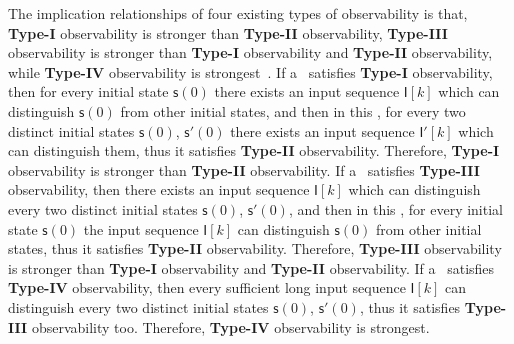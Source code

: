 The implication relationships of four existing types of observability is that, {\bf Type-I} observability is stronger than {\bf Type-II} observability, {\bf Type-III} observability is stronger than {\bf Type-I} observability and {\bf Type-II} observability, while {\bf Type-IV} observability is strongest~\cite{Zhang2016Observability}. If a \BCN\ satisfies {\bf Type-I} observability, then for every initial state $\mathsf{s}(0)$ there exists an input sequence $\mathsf{I}[k]$ which can distinguish $\mathsf{s}(0)$ from other initial states, and then in this \BCN, for every two distinct initial states $\mathsf{s}(0)$, $\mathsf{s}'(0) $ there exists an input sequence $\mathsf{I}'[k]$ which can distinguish them, thus it satisfies {\bf Type-II} observability. Therefore, {\bf Type-I} observability is stronger than {\bf Type-II} observability. If a \BCN\ satisfies {\bf Type-III} observability, then there exists an input sequence $\mathsf{I}[k]$ which can distinguish every two distinct initial states $\mathsf{s}(0)$, $\mathsf{s}'(0)$, and then in this \BCN, for every initial state $\mathsf{s}(0)$ the input sequence $\mathsf{I}[k]$ can distinguish $\mathsf{s}(0)$ from other initial states, thus it satisfies {\bf Type-II} observability. Therefore, {\bf Type-III} observability is stronger than {\bf Type-I} observability and {\bf Type-II} observability. If a \BCN\ satisfies {\bf Type-IV} observability, then every sufficient long input sequence $\mathsf{I}[k]$ can distinguish every two distinct initial states $\mathsf{s}(0)$, $\mathsf{s}'(0)$, thus it satisfies {\bf Type-III} observability too. Therefore, {\bf Type-IV} observability is strongest. 

      






